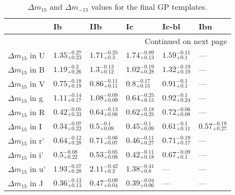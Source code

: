 \begin{longtable}{llllll}
  \caption{${\Delta m}_{15}$ and ${\Delta m}_{-15}$ values for the final GP templates.}\label{tab:del_m}\\

\toprule
{} &                      Ib &                     IIb &                      Ic &                   Ic-bl&                     Ibn \\
\midrule
\endhead
\midrule
\multicolumn{12}{r}{{Continued on next page}} \\
\midrule
\endfoot

\bottomrule
\endlastfoot

${\Delta m}_{15}$ in U   &  $1.35^{-0.27}_{+0.23}$ &   $1.71^{-0.25}_{+0.3}$ &  $1.74^{-0.89}_{+0.13}$ &   $1.59^{-0.11}_{+0.1}$ &                     --- \\
${\Delta m}_{15}$ in B   &   $1.19^{-0.3}_{+0.26}$ &   $1.3^{-0.13}_{+0.12}$ &  $1.02^{-0.19}_{+0.28}$ &  $1.32^{-0.19}_{+0.19}$ &                     --- \\
${\Delta m}_{15}$ in V   &  $0.75^{-0.18}_{+0.19}$ &  $0.86^{-0.11}_{+0.11}$ &   $0.8^{-0.17}_{+0.15}$ &    $0.91^{-0.1}_{+0.1}$ &                     --- \\
${\Delta m}_{15}$ in g   &  $1.11^{-0.14}_{+0.17}$ &  $1.08^{-0.09}_{+0.09}$ &  $0.64^{-0.25}_{+0.15}$ &   $0.92^{-0.1}_{+0.24}$ &                     --- \\
${\Delta m}_{15}$ in R   &  $0.42^{-0.05}_{+0.33}$ &  $0.64^{-0.13}_{+0.08}$ &  $0.62^{-0.18}_{+0.25}$ &  $0.72^{-0.06}_{+0.08}$ &                     --- \\
${\Delta m}_{15}$ in I   &  $0.34^{-0.07}_{+0.22}$ &    $0.5^{-0.1}_{+0.09}$ &   $0.45^{-0.1}_{+0.09}$ &   $0.61^{-0.1}_{+0.11}$ &  $0.57^{-0.19}_{+0.27}$ \\
${\Delta m}_{15}$ in r'  &  $0.64^{-0.12}_{+0.28}$ &  $0.71^{-0.06}_{+0.07}$ &  $0.46^{-0.11}_{+0.27}$ &  $0.71^{-0.19}_{+0.17}$ &                     --- \\
${\Delta m}_{15}$ in i'  &   $0.5^{-0.08}_{+0.22}$ &  $0.53^{-0.05}_{+0.08}$ &  $0.42^{-0.11}_{+0.18}$ &   $0.67^{-0.09}_{+0.1}$ &                     --- \\
${\Delta m}_{15}$ in u'  &  $1.93^{-0.57}_{+0.28}$ &   $2.11^{-0.42}_{+0.2}$ &   $1.38^{-0.41}_{+0.8}$ &                     --- &                     --- \\
${\Delta m}_{15}$ in J   &  $0.36^{-0.13}_{+0.13}$ &  $0.47^{-0.09}_{+0.04}$ &  $0.39^{-0.04}_{+0.06}$ &                     --- &                     --- \\

\end{longtable}
